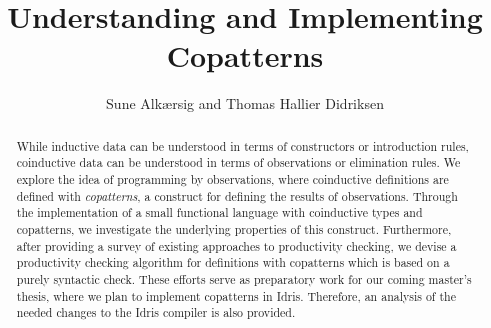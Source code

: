 \documentclass[oribibl]{llncs}
\begin{document}
\mainmatter
\title{Understanding and Implementing Copatterns}
\author{Sune Alk\ae{}rsig and Thomas Hallier Didriksen \\
}

\maketitle

\begin{abstract}
While inductive data can be understood in terms of constructors or introduction rules, coinductive data can be understood in terms of observations or elimination rules. We explore the idea of programming by observations, where coinductive definitions are defined with \emph{copatterns}, a construct for defining the results of observations. Through the implementation of a small functional language with coinductive types and copatterns, we investigate the underlying properties of this construct. Furthermore, after providing a survey of existing approaches to productivity checking, we devise a productivity checking algorithm for definitions with copatterns which is based on a purely syntactic check. These efforts serve as preparatory work for our coming master's thesis, where we plan to implement copatterns in Idris. Therefore, an analysis of the needed changes to the Idris compiler is also provided.
\end{abstract}












\end{document}
